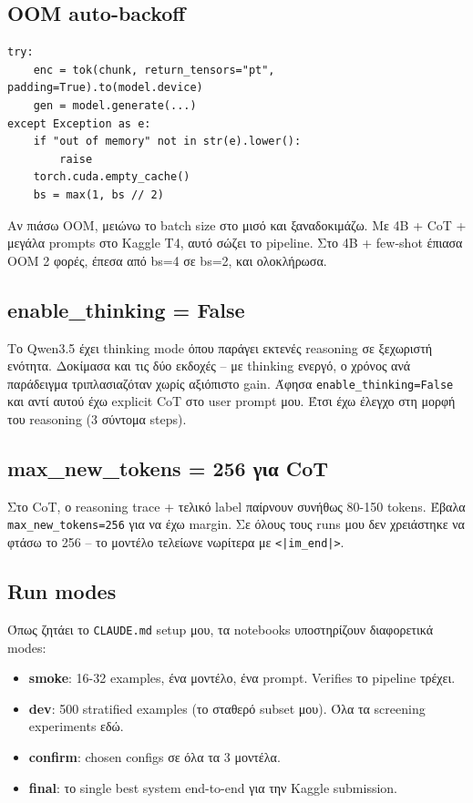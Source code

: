 \documentclass[12pt]{fphw}
\begin{document}
\subsection{OOM auto-backoff}

\begin{verbatim}
try:
    enc = tok(chunk, return_tensors="pt", padding=True).to(model.device)
    gen = model.generate(...)
except Exception as e:
    if "out of memory" not in str(e).lower():
        raise
    torch.cuda.empty_cache()
    bs = max(1, bs // 2)
\end{verbatim}

Αν πιάσω OOM, μειώνω το batch size στο μισό και ξαναδοκιμάζω. Με 4B + CoT + μεγάλα prompts στο Kaggle T4, αυτό σώζει το pipeline. Στο 4B + few-shot έπιασα OOM 2 φορές, έπεσα από bs=4 σε bs=2, και ολοκλήρωσα.

\subsection{enable\_thinking = False}

Το Qwen3.5 έχει thinking mode όπου παράγει εκτενές reasoning σε ξεχωριστή ενότητα. Δοκίμασα και τις δύο εκδοχές -- με thinking ενεργό, ο χρόνος ανά παράδειγμα τριπλασιαζόταν χωρίς αξιόπιστο gain. Άφησα \texttt{enable\_thinking=False} και αντί αυτού έχω explicit CoT στο user prompt μου. Έτσι έχω έλεγχο στη μορφή του reasoning (3 σύντομα steps).

\subsection{max\_new\_tokens = 256 για CoT}

Στο CoT, ο reasoning trace + τελικό label παίρνουν συνήθως 80-150 tokens. Έβαλα \texttt{max\_new\_tokens=256} για να έχω margin. Σε όλους τους runs μου δεν χρειάστηκε να φτάσω το 256 -- το μοντέλο τελείωνε νωρίτερα με \texttt{<|im\_end|>}.

\subsection{Run modes}

Όπως ζητάει το \texttt{CLAUDE.md} setup μου, τα notebooks υποστηρίζουν διαφορετικά modes:

\begin{itemize}
    \item \textbf{smoke}: 16-32 examples, ένα μοντέλο, ένα prompt. Verifies το pipeline τρέχει.
    \item \textbf{dev}: 500 stratified examples (το σταθερό subset μου). Όλα τα screening experiments εδώ.
    \item \textbf{confirm}: chosen configs σε όλα τα 3 μοντέλα.
    \item \textbf{final}: το single best system end-to-end για την Kaggle submission.
\end{itemize}
\end{document}
